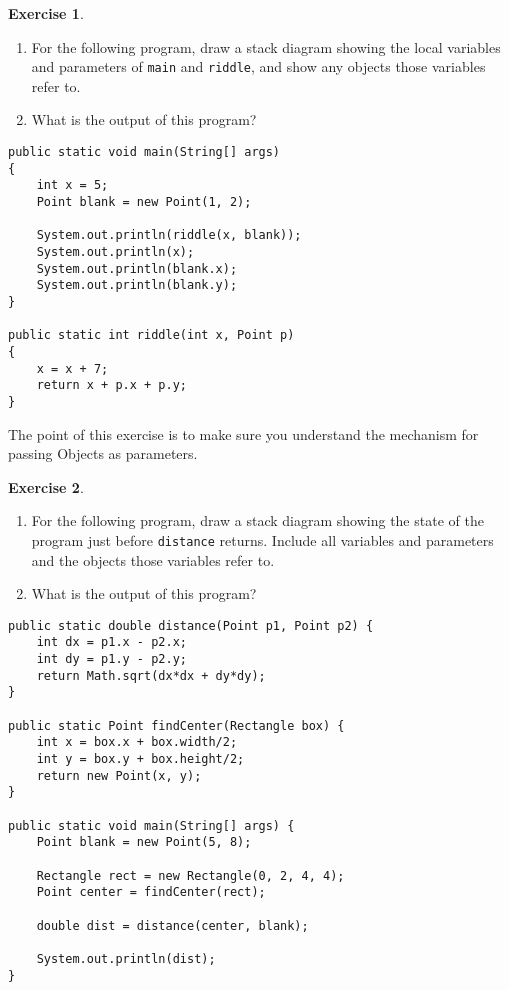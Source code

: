 \documentclass[12pt]{book}
\theoremstyle{definition}
\newtheorem{excz}{Exercise}[chapter]
\newenvironment{exercise}{\bigskip\begin{excz}\mbox{}}{\end{excz}}
\begin{document}
\begin{exercise}
\begin{enumerate}

\item For the following program, draw a stack diagram showing the
local variables and parameters of {\tt main} and {\tt riddle}, and show
any objects those variables refer to.

\item What is the output of this program?

\end{enumerate}

\begin{lstlisting}
public static void main(String[] args)
{
    int x = 5;
    Point blank = new Point(1, 2);

    System.out.println(riddle(x, blank));
    System.out.println(x);
    System.out.println(blank.x);
    System.out.println(blank.y);
}

public static int riddle(int x, Point p)
{
    x = x + 7;
    return x + p.x + p.y;
}
\end{lstlisting}

The point of this exercise is to make sure you understand the
mechanism for passing Objects as parameters.
\end{exercise}


\begin{exercise}
\begin{enumerate}

\item For the following program, draw a stack diagram showing the
state of the program just before {\tt distance} returns.  Include all
variables and parameters and the objects those variables refer to.

\item What is the output of this program?

\end{enumerate}

\begin{lstlisting}
public static double distance(Point p1, Point p2) {
    int dx = p1.x - p2.x;
    int dy = p1.y - p2.y;
    return Math.sqrt(dx*dx + dy*dy);
}

public static Point findCenter(Rectangle box) {
    int x = box.x + box.width/2;
    int y = box.y + box.height/2;
    return new Point(x, y);
}  

public static void main(String[] args) {
    Point blank = new Point(5, 8);

    Rectangle rect = new Rectangle(0, 2, 4, 4);
    Point center = findCenter(rect);

    double dist = distance(center, blank);

    System.out.println(dist);
}
\end{lstlisting}
%
\end{exercise}
\end{document}
